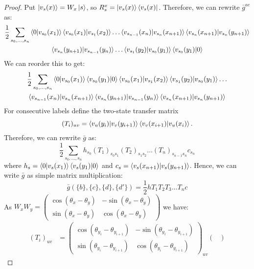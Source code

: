 \documentclass[aps,floatfix,10pt,amssymb,amsfont,amsmath,superscriptaddress,float,nofootinbib,longbibliography,nobalancelastpage,twocolumn]{revtex4-2}
\begin{document}
\begin{proof}
Put $\ket{v_s(x)}=W_x\ket{s}$, so
$R_s^x=\ket{v_s(x)}\bra{v_s(x)}$. Therefore, we can rewrite $\bar g^{ae}$ as:
\begin{multline}
    \frac{1}{2}\sum_{s_0,\ldots,s_n} \braket{0|v_{s_0}(x_1)}\braket{v_{s_0}(x_1)|v_{s_1}(x_2)}\ldots \braket{v_{s_{n-1}}(x_n)|v_{s_n}(x_{n+1})}\braket{v_{s_n}(x_{n+1})|v_{s_n}(y_{n+1})}\\\braket{v_{s_n}(y_{n+1})|v_{s_{n-1}}(y_n)}\ldots\braket{v_{s_1}(y_2)|v_{s_0}(y_1)}\braket{v_{s_0}(y_1)|0}
\end{multline}
We can reorder this to get:
\begin{multline}
    \frac{1}{2}\sum_{s_0,\ldots,s_n} \braket{0|v_{s_0}(x_1)}\braket{v_{s_0}(y_1)|0}\braket{v_{s_0}(x_1)|v_{s_1}(x_2)}\braket{v_{s_1}(y_2)|v_{s_0}(y_1)}\ldots\\ \braket{v_{s_{n-1}}(x_{n})|v_{s_{n}}(x_{n+1})}\braket{v_{s_{n}}(y_{n+1})|v_{s_{n-1}}(y_{n})}\braket{v_{s_{n}}(x_{n+1})|v_{s_{n}}(y_{n+1})}
\end{multline}
For consecutive labels define
the two-state transfer matrix
\begin{equation*}
    (T_i)_{uv}=\braket{v_u(y_i)|v_v(y_{i+1})}
    \braket{v_v(x_{i+1})|v_u(x_i)}.
\end{equation*}
Therefore, we can rewrite $\bar g$ as:
\begin{equation}
   \frac{1}{2}\sum_{s_0,\ldots,s_n} h_{s_0}(T_1)_{s_0s_1}(T_2)_{s_1s_2}\ldots (T_n)_{s_{n-1}s_{n}} c_{s_n}
\end{equation}
where $h_s = \braket{0|v_{s}(x_1)}\braket{v_{s}(y_1)|0}$ and $c_s =\braket{v_{s}(x_{n+1})|v_{s}(y_{n+1})}$. Hence, we can write $\bar g$ as simple matrix multiplication:
\begin{equation}
    \bar g(\{b\},\{c\},\{d\},\{d'\}) = \frac{1}{2}hT_1T_2T_3\ldots T_nc
\end{equation}
As $W_xW_y = \begin{pmatrix}
    \cos (\theta_x - \theta_y) & - \sin (\theta_x - \theta_y)\\
     \sin (\theta_x - \theta_y) & \cos (\theta_x - \theta_y)
\end{pmatrix}$ we have:
\begin{align}
    (T_i)_{u v} &=  \begin{pmatrix}
    \cos (\theta_{y_i} - \theta_{y_{i+1}}) & - \sin (\theta_{y_i} - \theta_{y_{i+1}})\\
     \sin (\theta_{y_i} - \theta_{y_{i+1}}) & \cos (\theta_{y_i} - \theta_{y_{i+1}})
\end{pmatrix}_{uv} \begin{pmatrix}

\end{pmatrix}
\end{align}
\end{proof}
\end{document}
